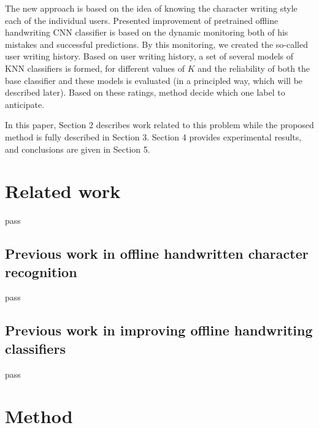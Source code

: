 \documentclass{article}
\begin{document}

The new approach is based on the idea of knowing the character writing style each of the individual users. 
Presented improvement of pretrained offline handwriting CNN classifier is based on the dynamic monitoring both of his mistakes and successful predictions. 
By this monitoring, we created the so-called user writing history. 
Based on user writing history, a set of several models of KNN classifiers is formed, for different values of $K$ and the reliability of both the base classifier and these models is evaluated (in a principled way, which will be described later). 
Based on these ratings, method decide which one label to anticipate. 

In this paper, Section 2 describes work related to this problem while the proposed method is fully described in Section 3.
Section 4 provides experimental results, and conclusions are given in Section 5.

\section{Related work}
pass 

\subsection{Previous work in offline handwritten character recognition}
pass

\subsection{Previous work in improving offline handwriting classifiers}
pass

\section{Method}
\end{document}
